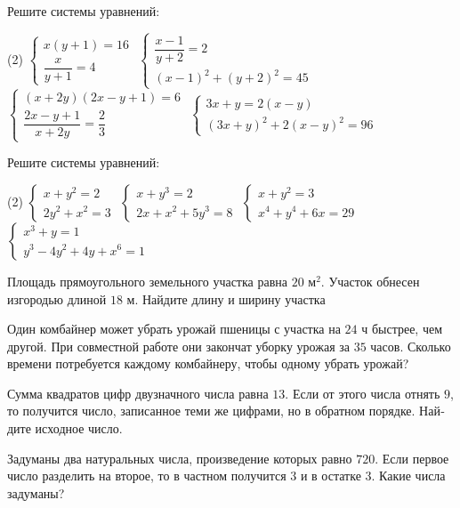\begin{class}[number=5]
	\begin{listofex}
		\item Решите системы уравнений:
		\begin{tasks}(2)
			\task \( \begin{cases} x(y+1)=16 \\ \dfrac{ x }{ y+1 }=4 \end{cases} \)
			\task \( \begin{cases} \dfrac{ x-1 }{ y+2 }=2 \\ (x-1)^2+(y+2)^2=45 \end{cases} \)
			\task \( \begin{cases} (x+2y)(2x-y+1)=6 \\ \dfrac{ 2x-y+1 }{ x+2y }=\dfrac{ 2 }{ 3 } \end{cases} \)
			\task \( \begin{cases} 3x+y=2(x-y) \\ (3x+y)^2+2(x-y)^2=96 \end{cases} \)
		\end{tasks}
		\item Решите системы уравнений:
		\begin{tasks}(2)
			\task \( \begin{cases} x+y^2=2 \\ 2y^2+x^2=3 \end{cases} \)
			\task \( \begin{cases} x+y^3=2 \\ 2x+x^2+5y^3=8 \end{cases} \)
			\task \( \begin{cases} x+y^2=3 \\ x^4+y^4+6x=29 \end{cases} \)
			\task \( \begin{cases} x^3+y=1 \\ y^3-4y^2+4y+x^6=1 \end{cases} \)
		\end{tasks}
		\item Площадь прямоугольного земельного участка равна \(20\) м\(^2\). Участок обнесен изгородью длиной \(18\) м. Найдите длину и ширину участка
		\item Один комбайнер может убрать урожай пшеницы с участка на \(24\) ч быстрее, чем другой. При совместной работе они закончат уборку урожая за \(35\) часов. Сколько времени потребуется каждому комбайнеру, чтобы одному убрать урожай?
		\item Сумма квад­ра­тов цифр дву­знач­но­го числа равна \(13\). Если от этого числа от­нять \(9\), то по­лу­чит­ся число, за­пи­сан­ное теми же циф­ра­ми, но в об­рат­ном по­ряд­ке. Най­ди­те ис­ход­ное число.
		\item За­ду­ма­ны два на­ту­раль­ных числа, про­из­ве­де­ние ко­то­рых равно \(720\). Если пер­вое число раз­де­лить на вто­рое, то в част­ном по­лу­чит­ся \(3\) и в остат­ке \(3\). Какие числа за­ду­ма­ны?
	\end{listofex}
\end{class}

